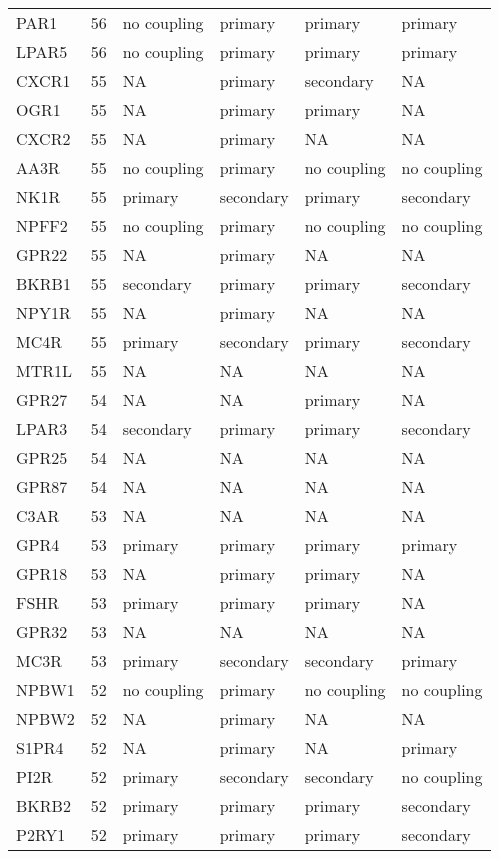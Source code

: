 \begin{longtable}{lrllll}
PAR1 & 56 & no coupling & primary & primary & primary\\
LPAR5 & 56 & no coupling & primary & primary & primary\\
CXCR1 & 55 & NA & primary & secondary & NA\\
OGR1 & 55 & NA & primary & primary & NA\\
CXCR2 & 55 & NA & primary & NA & NA\\
\addlinespace
AA3R & 55 & no coupling & primary & no coupling & no coupling\\
NK1R & 55 & primary & secondary & primary & secondary\\
NPFF2 & 55 & no coupling & primary & no coupling & no coupling\\
GPR22 & 55 & NA & primary & NA & NA\\
BKRB1 & 55 & secondary & primary & primary & secondary\\
\addlinespace
NPY1R & 55 & NA & primary & NA & NA\\
MC4R & 55 & primary & secondary & primary & secondary\\
MTR1L & 55 & NA & NA & NA & NA\\
GPR27 & 54 & NA & NA & primary & NA\\
LPAR3 & 54 & secondary & primary & primary & secondary\\
\addlinespace
GPR25 & 54 & NA & NA & NA & NA\\
GPR87 & 54 & NA & NA & NA & NA\\
C3AR & 53 & NA & NA & NA & NA\\
GPR4 & 53 & primary & primary & primary & primary\\
GPR18 & 53 & NA & primary & primary & NA\\
\addlinespace
FSHR & 53 & primary & primary & primary & NA\\
GPR32 & 53 & NA & NA & NA & NA\\
MC3R & 53 & primary & secondary & secondary & primary\\
NPBW1 & 52 & no coupling & primary & no coupling & no coupling\\
NPBW2 & 52 & NA & primary & NA & NA\\
\addlinespace
S1PR4 & 52 & NA & primary & NA & primary\\
PI2R & 52 & primary & secondary & secondary & no coupling\\
BKRB2 & 52 & primary & primary & primary & secondary\\
P2RY1 & 52 & primary & primary & primary & secondary\\

\end{longtable}
